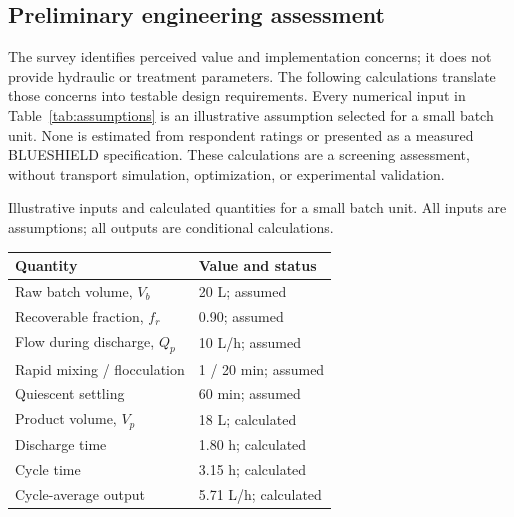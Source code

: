 \documentclass{ieeeaccess}
\makeatletter
\newenvironment{inlinetable}{\par\addvspace{6pt plus 10pt minus 2pt}\noindent\begin{minipage}{\linewidth}\def\@captype{table}\centering}{\end{minipage}\par\addvspace{7pt plus 10pt minus 2pt}}
\makeatother
\begin{document}
\begin{multicols}{2}


\section{Preliminary engineering assessment}
\label{sec:engineering}
The survey identifies perceived value and implementation concerns; it does not provide hydraulic or treatment parameters. The following calculations translate those concerns into testable design requirements. Every numerical input in Table~\ref{tab:assumptions} is an illustrative assumption selected for a small batch unit. None is estimated from respondent ratings or presented as a measured BLUESHIELD specification. These calculations are a screening assessment, without transport simulation, optimization, or experimental validation.

\begin{inlinetable}
\caption{Illustrative inputs and calculated quantities for a small batch unit. All inputs are assumptions; all outputs are conditional calculations.}
\label{tab:assumptions}
\centering\small
\begin{tabular}{p{}p{}}
\toprule
Quantity & Value and status\\
\midrule
Raw batch volume, $V_b$ & 20 L; assumed\\
Recoverable fraction, $f_r$ & 0.90; assumed\\
Flow during discharge, $Q_p$ & 10 L/h; assumed\\
Rapid mixing / flocculation & 1 / 20 min; assumed\\
Quiescent settling & 60 min; assumed\\
Product volume, $V_p$ & 18 L; calculated\\
Discharge time & 1.80 h; calculated\\
Cycle time & 3.15 h; calculated\\
Cycle-average output & 5.71 L/h; calculated\\
\bottomrule
\end{tabular}
\end{inlinetable}


\end{multicols}
\end{document}

